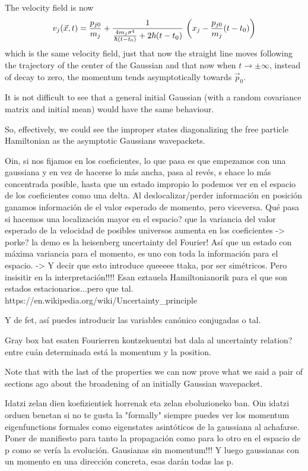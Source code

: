 \documentclass[11pt, a4paper]{article} %
\begin{document}
The velocity field is now
\begin{equation}
v_j(\vec{x},t)=\frac{p_{j0}}{m_j}+\frac{1}{\frac{4m_j\sigma^4}{\hbar(t-t_0)}+2\hbar(t-t_0)}\ \qty(x_j-\frac{p_{j0}}{m_j}(t-t_0))
\end{equation}
which is the same velocity field, just that now the straight line moves following the trajectory of the center of the Gaussian and that now when $t\rightarrow\pm\infty$, instead of decay to zero, the momentum tends asymptotically towards $\vec{p}_0$.

It is not difficult to see that a general initial Gaussian (with a random covariance matrix and initial mean) would have the same behaviour.

So, effectively, we could see the improper states diagonalizing the free particle Hamiltonian as the asymptotic Gaussians wavepackets.

Oin, si nos fijamos en los coeficientes, lo que pasa es que empezamos con una gaussiana y en vez de hacerse lo más ancha, pasa al revés, s ehace lo más concentrada posible, hasta que un estado impropio lo podemos ver en el espacio de los coeficientes como una delta. Al deslocalizar/perder información en posición ganamos información de el valor esperado de momento, pero viceversa. Qué pasa si hacemos una localización mayor en el espacio? que la variancia del valor esperado de la velocidad de posibles universos aumenta en los coeficientes -> porke? la demo es la heisenberg uncertainty del Fourier! Así que un estado con máxima variancia para el momento, es uno con toda la información para el espacio. -> Y decir que esto introduce queeeee ttaka, por ser simétricos.
Pero insisitir en la interpretación!!!! Esan eztauela Hamiltonianorik para el que son estados estacionarios...pero que tal.
https://en.wikipedia.org/wiki/Uncertainty_principle	

Y de fet, así puedes introducir las variables canónico conjugadas o tal.





 
Gray box bat esaten Fourierren kontzekuentzi bat dala al uncertainty relation? entre cuán determinada está la momentum y la position.

Note that with the last of the properties we can now prove what we said a pair of sections ago about the broadening of an initially Gaussian wavepacket.

Idatzi zelan dien koefizientiek horrenak eta zelan eboluzioneko ban. Oin idatzi orduen benetan si no te gusta la "formally" siempre puedes ver los momentum eigenfunctions formales como eigenstates asintóticos de la gaussiana al achafarse. Poner de manifiesto para tanto la propagación como para lo otro en el espacio de p como se vería la evolución.  Gausianas sin momentum!!! Y luego gaussianas con un momento en una dirección concreta, esas darán todas las p.
\end{document}
